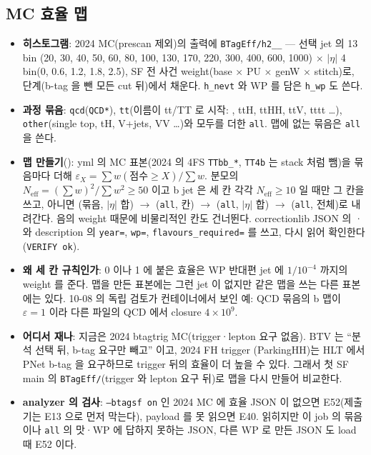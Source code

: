 \subsection{MC 효율 맵}\label{sec:btag-effmaps}

\begin{itemize}
\item \textbf{히스토그램}: 2024 MC(prescan 제외)의 출력에 \texttt{BTagEff/h2\_<b|c|l>\_<all|L|M|T>} --- 선택 jet 의 \pt{} 13 bin
  (20, 30, 40, 50, 60, 80, 100, 130, 170, 220, 300, 400, 600, 1000\GeV) $\times$ $|\eta|$ 4 bin(0, 0.6, 1.2, 1.8, 2.5), SF 전 사건 weight(base
  $\times$ PU $\times$ genW $\times$ stitch)로, \HT{} 단계(b-tag 을 뺀 모든 cut 뒤)에서 채운다. \texttt{h\_nevt} 와 WP 를 담은 \texttt{h\_wp} 도
  쓴다\tagimpl.
\item \textbf{과정 묶음}: \texttt{qcd}(\texttt{QCD*}), \texttt{tt}(이름이 tt/TT 로 시작: \ttbar, ttH, ttHH, ttV, tttt …), \texttt{other}(single top,
  tH, V+jets, VV …)와 모두를 더한 \texttt{all}. 맵에 없는 묶음은 \texttt{all} 을 쓴다.
\item \textbf{맵 만들기}(): yml 의 MC 표본(2024 의 4FS \texttt{TTbb\_*}, \texttt{TT4b} 는 stack 처럼 뺌)을
  묶음마다 더해 $\varepsilon_X = \sum w(\text{점수}\geq X)/\sum w$. 분모의 $N_\text{eff}=(\sum w)^2/\sum w^2 \geq 50$ 이고 b jet 은 세 칸 각각
  $N_\text{eff}\geq 10$ 일 때만 그 칸을 쓰고, 아니면 (묶음, $|\eta|$ 합) $\to$ (\texttt{all}, 칸) $\to$ (\texttt{all}, $|\eta|$ 합) $\to$ (\texttt{all},
  전체)로 내려간다. 음의 weight 때문에 비물리적인 칸도 건너뛴다. correctionlib JSON 의 · 와
  description 의 \texttt{year=}, \texttt{wp=}, \texttt{flavours\_required=} 를 쓰고, 다시 읽어 확인한다(\texttt{VERIFY ok})\tagimpl.
\item \textbf{왜 세 칸 규칙인가}: 0 이나 1 에 붙은 효율은 WP 반대편 jet 에 $1/10^{-4}$ 까지의 weight 를 준다. 맵을 만든 표본에는 그런 jet 이 없지만
  같은 맵을 쓰는 다른 표본에는 있다. 10-08 의 독립 검토가 컨테이너에서 보인 예: QCD 묶음의 b 맵이 $\varepsilon=1$ 이라 다른 파일의 QCD 에서
  closure $4\times10^{9}$.
\item \textbf{어디서 재나}: 지금은 2024 btagtrig MC(trigger·lepton 요구 없음). BTV 는 ``분석 선택 뒤, b-tag 요구만 빼고'' 이고, 2024 FH trigger
  (ParkingHH)는 HLT 에서 PNet b-tag 을 요구하므로 trigger 뒤의 효율이 더 높을 수 있다. 그래서 첫 SF main 의 \texttt{BTagEff/}(trigger 와 lepton 요구
  뒤)로 맵을 다시 만들어 비교한다\tagplan.
\item \textbf{analyzer 의 검사}: \texttt{--btagsf on} 인 2024 MC 에 효율 JSON 이 없으면 E52(제출기는 E13 으로 먼저 막는다), payload 를 못 읽으면
  E40. 읽히지만 이 job 의 묶음이나
  \texttt{all} 의 맛·WP 에 답하지 못하는 JSON, 다른 WP 로 만든 JSON 도 load 때 E52 이다\tagimpl.
\end{itemize}


